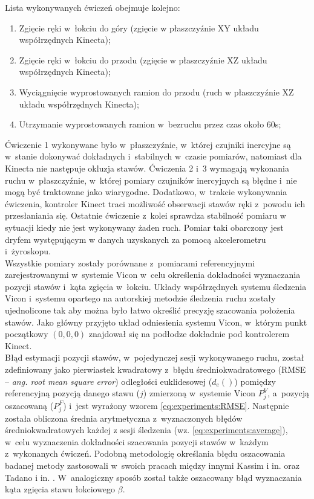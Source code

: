 Lista wykonywanych ćwiczeń obejmuje kolejno:
\begin{enumerate}
	\item Zgięcie ręki w~łokciu do góry (zgięcie w płaszczyźnie XY układu współrzędnych Kinecta); \\
	\item Zgięcie ręki w~łokciu do przodu (zgięcie w płaszczyźnie XZ układu współrzędnych Kinecta); \\
	\item Wyciągnięcie wyprostowanych ramion do przodu (ruch w płaszczyźnie XZ układu współrzędnych Kinecta); \\
	\item Utrzymanie wyprostowanych ramion w~bezruchu przez czas około 60s; \\
\end{enumerate}

Ćwiczenie 1 wykonywane było w~płaszczyźnie, w~której czujniki inercyjne są w~stanie dokonywać dokładnych i~stabilnych w~czasie pomiarów, natomiast dla Kinecta nie następuje okluzja stawów. Ćwiczenia 2 i~3 wymagają wykonania ruchu w~płaszczyźnie, w~której pomiary czujników inercyjnych są błędne i~nie mogą być traktowane jako wiarygodne. Dodatkowo, w~trakcie wykonywania ćwiczenia, kontroler Kinect traci możliwość obserwacji stawów ręki z~powodu ich przesłaniania się. Ostatnie ćwiczenie z~kolei sprawdza stabilność pomiaru w sytuacji kiedy nie jest wykonywany żaden ruch. Pomiar taki obarczony jest dryfem występującym w danych uzyskanych za pomocą akcelerometru i~żyroskopu.\\

Wszystkie pomiary zostały porównane z~pomiarami referencyjnymi zarejestrowanymi w~systemie Vicon w~celu określenia dokładności wyznaczania pozycji stawów i~kąta zgięcia w~łokciu. Układy współrzędnych systemu śledzenia Vicon i~systemu opartego na autorskiej metodzie śledzenia ruchu zostały ujednolicone tak aby można było łatwo określić precyzję szacowania położenia stawów. Jako główny przyjęto układ odniesienia systemu Vicon, w~którym punkt początkowy $(0,0,0)$ znajdował się na podłodze dokładnie pod kontrolerem Kinect.\\

Błąd estymacji pozycji stawów, w~pojedynczej sesji wykonywanego ruchu, został zdefiniowany jako pierwiastek kwadratowy z~błędu średniokwadratowego (RMSE -- \emph{ang. root mean square error}) odległości euklidesowej ($d_e()$) pomiędzy referencyjną pozycją danego stawu ($j$) zmierzoną w~systemie Vicon $P^V_j$, a~pozycją oszacowaną ($P^F_j$) i~jest wyrażony wzorem \ref{eq:experiments:RMSE}. Następnie została obliczona średnia arytmetyczna z~wyznaczonych błędów średniokwadratowych każdej z sesji śledzenia (wz. \ref{eq:experiments:average}), w~celu wyznaczenia dokładności szacowania pozycji stawów w~każdym z~wykonanych ćwiczeń. Podobną metodologię określania błędu oszacowania badanej metody zastosowali w~swoich pracach między innymi Kassim i in. \cite{Kassim2008} oraz Tadano i in. \cite{Tadano2013}. W~analogiczny sposób został także oszacowany błąd wyznaczania kąta zgięcia stawu łokciowego $\beta$.

